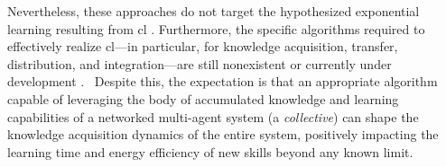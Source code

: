 \documentclass[12pt]{article}
\newcommand\myhl[1]{\textcolor{blue}{#1}}
\renewcommand{\emph}[1]{\textit{#1}}
\begin{document}
Nevertheless, these approaches do not target the hypothesized exponential learning resulting from \ac{cl} \cite{Haddadin2019Breakingwallcollective}. Furthermore, the specific algorithms required to effectively realize \ac{cl}---in particular, for knowledge acquisition, transfer, distribution, and integration---are still nonexistent or currently under development \cite{Haddadin2022collectivelearningtheory}.%
~Despite this, the expectation is that an appropriate algorithm capable of leveraging the body of accumulated knowledge and learning capabilities of a networked multi-agent system (a \emph{collective}) can shape the knowledge acquisition dynamics of the entire system, positively impacting the learning time and energy efficiency of new skills beyond any known limit.

\end{document}
